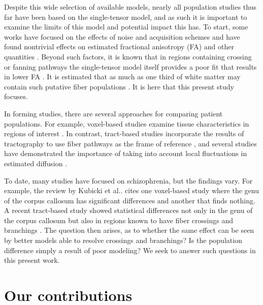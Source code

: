 \documentclass[final,hyperref]{gatech-thesis}
\makeatletter
\DeclareRobustCommand\onedot{\futurelet\@let@token\@onedot}
\def\@onedot{\ifx\@let@token.\else.\null\fi\xspace}
\newcommand{\etal}{et al\onedot}
\makeatother
\begin{document}
Despite this wide selection of available models, nearly all population studies
thus far have been based on the single-tensor model, and as such it is
important to examine the limits of this model and potential impact this has.
%
To start, some works have focused on the effects of noise and acquisition
schemes and have found nontrivial effects on estimated fractional anisotropy
(FA) and other quantities \cite{Basser2000noise,Jones2004,Goodlett2007}.
%
Beyond such factors, it is known that in regions containing crossing or
fanning pathways the single-tensor model itself provides a poor fit that
results in lower FA \cite{Alexander2002,Tuch2002}.  It is estimated
that as much as one third of white matter may contain such putative fiber
populations \cite{Behrens2007}.
%
It is here that this present study focuses.

In forming studies, there are several approaches for comparing patient
populations.
%
For example, voxel-based studies examine tissue characteristics in regions of
interest \cite{Ashburner2000}.
%
In contrast, tract-based studies incorporate the results of tractography to
use fiber pathways as the frame of reference \cite{Ding2003,Smith2006}, and
several studies have demonstrated the importance of taking into account local
fluctuations in estimated diffusion
\cite{Corouge2006,Fletcher2007ipmi,ODonnell2007,Maddah2008,Goodlett2009}.

To date, many studies have focused on schizophrenia, but the findings vary.
For example, the review by Kubicki \etal \cite{Kubicki2007} cites one
voxel-based study where the genu of the corpus callosum has significant
differences and another that finds nothing.  A recent tract-based study showed
statistical differences not only in the genu of the corpus callosum but also
in regions known to have fiber crossings and branchings \cite{Maddah2008}.
The question then arises, as to whether the same effect can be seen by better
models able to resolve crossings and branchings?  Is the population difference
simply a result of poor modeling?  We seek to answer such questions in this
present work.




\section{Our contributions}
\end{document}
